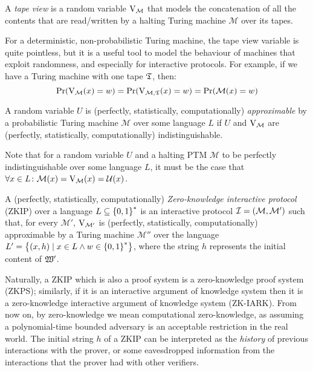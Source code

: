 \begin{definition}
  A \emph{tape view} is a random variable \(\mathrm{V}_{\mathcal{M}}\) that models the concatenation 
  of all the contents that are read/written by a halting Turing machine \(\mathcal{M}\) over its 
  tapes.
\end{definition}

For a deterministic, non-probabilistic Turing machine, the tape view variable is quite pointless, 
but it is a useful tool to model the behaviour of machines that exploit randomness, and especially 
for interactive protocols.
For example, if we have a Turing machine with one tape \(\mathfrak{T} \), then:
\[
  \call{\Pr}{\call{\View_{\mathcal{M}}}{x} = w} = 
  \call{\Pr}{\call{\View_{\mathcal{M}, \Tape}}{x} = w} = 
  \call{\Pr}{\call{\mathcal{M}}{x} = w}
\]


\begin{definition}[Approximability]
  A random variable \(U\) is (perfectly, statistically, computationally) \emph{approximable} by a 
  probabilistic Turing machine \(\mathcal{M}\) over some language \(L\) if \(U\) and 
  \(\mathrm{V}_{\mathcal{M}}\) are (perfectly, statistically, computationally) indistinguishable.
\end{definition}

Note that for a random variable \(U\) and a halting PTM \(\mathcal{M}\) to be perfectly 
indistinguishable over some language \(L\), it must be the case that 
\(\forall x \in L\colon \call{\mathcal{M}}{x} = \call{\View_{\mathcal{M}}}{x} = \call{\mathcal{U}}{x}\).

\begin{definition}
  A (perfectly, statistically, computationally) \emph{Zero-knowledge interactive protocol} (ZKIP) 
  over a language \(L \subseteq \left\{0, 1\right\}^{*}\) is an interactive protocol 
  \(\mathcal{I} = \left(\mathcal{M}, \mathcal{M}'\right)\) such that, for every \(\mathcal{M'}\),
  \(\mathrm{V}_{\mathcal{M'}}\) is (perfectly, statistically, computationally) approximable by a 
  Turing machine \(\mathcal{M}''\) over the language 
  \(L' = \left\{\left(x, h\right) \mid x \in L \wedge w \in \left\{0, 1\right\}^*\right\}\), where the string
  \(h\) represents the initial content of \(\mathfrak{W}'\).
\end{definition}

Naturally, a ZKIP which is also a proof system is a zero-knowledge proof system (ZKPS); similarly, 
if it is an interactive argument of knowledge system then it is a zero-knowledge interactive 
argument of knowledge system (ZK-IARK).
From now on, by zero-knowledge we mean computational zero-knowledge, as assuming a polynomial-time 
bounded adversary is an acceptable restriction in the real world.
The initial string \(h\) of a ZKIP can be interpreted as the \emph{history} of previous 
interactions with the prover, or some eavesdropped information from the interactions that the 
prover had with other verifiers.


